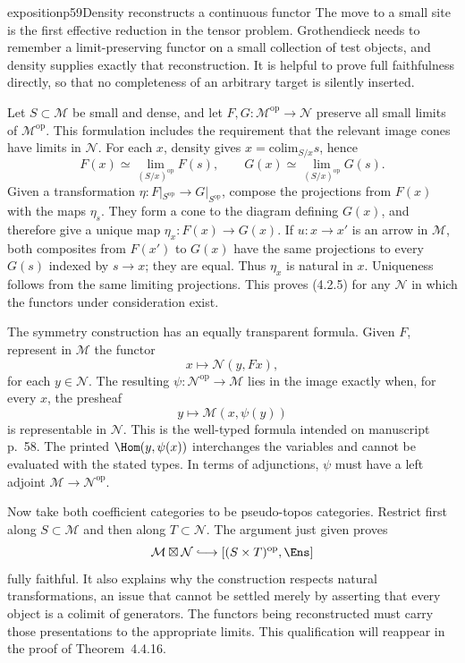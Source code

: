 \begin{dcomment}{exposition}{p59}{Density reconstructs a continuous functor}
The move to a small site is the first effective reduction in the tensor problem. Grothendieck needs to remember a limit-preserving functor on a small collection of test objects, and density supplies exactly that reconstruction. It is helpful to prove full faithfulness directly, so that no completeness of an arbitrary target is silently inserted.

Let $S\subset\mathcal M$ be small and dense, and let $F,G:\mathcal M^{\mathrm{op}}\to\mathcal N$ preserve all small limits of $\mathcal M^{\mathrm{op}}$. This formulation includes the requirement that the relevant image cones have limits in $\mathcal N$. For each $x$, density gives $x=\mathrm{colim}_{S/x}s$, hence
\[
 F(x)\simeq\lim_{(S/x)^{\mathrm{op}}}F(s),\qquad
 G(x)\simeq\lim_{(S/x)^{\mathrm{op}}}G(s).
\]
Given a transformation $\eta:F|_{S^{\mathrm{op}}}\to G|_{S^{\mathrm{op}}}$, compose the projections from $F(x)$ with the maps $\eta_s$. They form a cone to the diagram defining $G(x)$, and therefore give a unique map $\eta_x:F(x)\to G(x)$. If $u:x\to x'$ is an arrow in $\mathcal M$, both composites from $F(x')$ to $G(x)$ have the same projections to every $G(s)$ indexed by $s\to x$; they are equal. Thus $\eta_x$ is natural in $x$. Uniqueness follows from the same limiting projections. This proves (4.2.5) for any $\mathcal N$ in which the functors under consideration exist.

The symmetry construction has an equally transparent formula. Given $F$, represent in $\mathcal M$ the functor
\[
 x\longmapsto\mathcal N(y,Fx),
\]
for each $y\in\mathcal N$. The resulting $\psi:\mathcal N^{\mathrm{op}}\to\mathcal M$ lies in the image exactly when, for every $x$, the presheaf
\[
 y\longmapsto\mathcal M(x,\psi(y))
\]
is representable in $\mathcal N$. This is the well-typed formula intended on manuscript p.~58. The printed $\Hom(y,\psi(x))$ interchanges the variables and cannot be evaluated with the stated types. In terms of adjunctions, $\psi$ must have a left adjoint $\mathcal M\to\mathcal N^{\mathrm{op}}$.

Now take both coefficient categories to be pseudo-topos categories. Restrict first along $S\subset\mathcal M$ and then along $T\subset\mathcal N$. The argument just given proves
\[
 \mathcal M\boxtimes\mathcal N\lhook\joinrel\longrightarrow
 [(S\times T)^{\mathrm{op}},\Ens]
\]
fully faithful. It also explains why the construction respects natural transformations, an issue that cannot be settled merely by asserting that every object is a colimit of generators. The functors being reconstructed must carry those presentations to the appropriate limits. This qualification will reappear in the proof of Theorem~4.4.16.
\end{dcomment}

